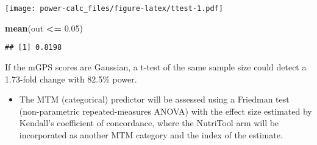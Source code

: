 \documentclass[]{article}
\newenvironment{Shaded}{\begin{snugshade}}{\end{snugshade}}
\newcommand{\ControlFlowTok}[1]{\textcolor[rgb]{0.13,0.29,0.53}{\textbf{#1}}}
\newcommand{\DataTypeTok}[1]{\textcolor[rgb]{0.13,0.29,0.53}{#1}}
\newcommand{\DecValTok}[1]{\textcolor[rgb]{0.00,0.00,0.81}{#1}}
\newcommand{\FloatTok}[1]{\textcolor[rgb]{0.00,0.00,0.81}{#1}}
\newcommand{\KeywordTok}[1]{\textcolor[rgb]{0.13,0.29,0.53}{\textbf{#1}}}
\newcommand{\NormalTok}[1]{#1}
\newcommand{\OperatorTok}[1]{\textcolor[rgb]{0.81,0.36,0.00}{\textbf{#1}}}
\newcommand{\StringTok}[1]{\textcolor[rgb]{0.31,0.60,0.02}{#1}}
\providecommand{\tightlist}{%
  \setlength{\itemsep}{0pt}\setlength{\parskip}{0pt}}
\begin{document}
\begin{Shaded}
\end{Shaded}

\texttt{[image: power-calc\_files/figure-latex/ttest-1.pdf]}

\begin{Shaded}
\begin{Highlighting}[]
\KeywordTok{mean}\NormalTok{(out }\OperatorTok{<=}\StringTok{ }\FloatTok{0.05}\NormalTok{)}
\end{Highlighting}
\end{Shaded}

\begin{verbatim}
## [1] 0.8198
\end{verbatim}

If the mGPS scores are Gaussian, a t-test of the same sample size could
detect a 1.73-fold change with 82.5\% power.

\begin{itemize}
\tightlist
\item
  The MTM (categorical) predictor will be assessed using a Friedman test
  (non-parametric repeated-measures ANOVA) with the effect size
  estimated by Kendall's coefficient of concordance, where the NutriTool
  arm will be incorporated as another MTM category and the index of the
  estimate.
\end{itemize}
\end{document}

